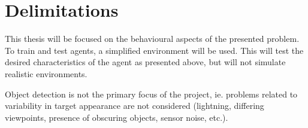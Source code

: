 \section{Delimitations}
\label{sec:delimitations}

This thesis will be focused on the behavioural aspects of the presented problem. To train and test agents, a simplified environment will be used. This will test the desired characteristics of the agent as presented above, but will not simulate realistic environments.

Object detection is not the primary focus of the project, ie. problems related to variability in target appearance are not considered (lightning, differing viewpoints, presence of obscuring objects, sensor noise, etc.).



